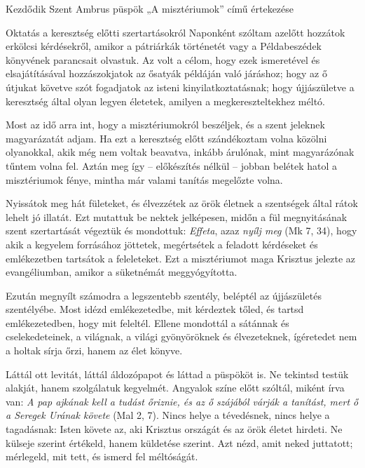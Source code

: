 \documentclass[twoside]{article}
\begin{document}


Kezdődik Szent Ambrus püspök „A misztériumok” című értekezése

{\centering{}}

\begin{lectio}{Oktatás a keresztség előtti szertartásokról}
\noindent Naponként szóltam azelőtt hozzátok erkölcsi kérdésekről, amikor a pátriárkák történetét vagy a Példabeszédek könyvének parancsait olvastuk. Az volt a célom, hogy ezek ismeretével és elsajátításával hozzászokjatok az ősatyák példáján való járáshoz; hogy az ő útjukat követve szót fogadjatok az isteni kinyilatkoztatásnak; hogy újjászületve a keresztség által olyan legyen életetek, amilyen a megkereszteltekhez méltó.

Most az idő arra int, hogy a misztériumokról beszéljek, és a szent jeleknek magyarázatát adjam. Ha ezt a keresztség előtt szándékoztam volna közölni olyanokkal, akik még nem voltak beavatva, inkább árulónak, mint magyarázónak tűntem volna fel. Aztán meg így – előkészítés nélkül – jobban belétek hatol a misztériumok fénye, mintha már valami tanítás megelőzte volna.

Nyissátok meg hát fületeket, és élvezzétek az örök életnek a szentségek által rátok lehelt jó illatát. Ezt mutattuk be nektek jelképesen, midőn a fül megnyitásának szent szertartását végeztük és mondottuk: \textit{Effeta}, azaz \textit{nyílj meg} (Mk 7, 34), hogy akik a kegyelem forrásához jöttetek, megértsétek a feladott kérdéseket és emlékezetben tartsátok a feleleteket. Ezt a misztériumot maga Krisztus jelezte az evangéliumban, amikor a süketnémát meggyógyította.

Ezután megnyílt számodra a legszentebb szentély, beléptél az újjászületés szentélyébe. Most idézd emlékezetedbe, mit kérdeztek tőled, és tartsd emlékezetedben, hogy mit feleltél. Ellene mondottál a sátánnak és cselekedeteinek, a világnak, a világi gyönyöröknek és élvezeteknek, ígéretedet nem a holtak sírja őrzi, hanem az élet könyve.

Láttál ott levitát, láttál áldozópapot és láttad a püspököt is. Ne tekintsd testük alakját, hanem szolgálatuk kegyelmét. Angyalok színe előtt szóltál, miként írva van: \textit{A pap ajkának kell a tudást őriznie, és az ő szájából várják a tanítást, mert ő a Seregek Urának követe} (Mal 2, 7). Nincs helye a tévedésnek, nincs helye a tagadásnak: Isten követe az, aki Krisztus országát és az örök életet hirdeti. Ne külseje szerint értékeld, hanem küldetése szerint. Azt nézd, amit neked juttatott; mérlegeld, mit tett, és ismerd fel méltóságát.


\end{lectio}
\end{document}
